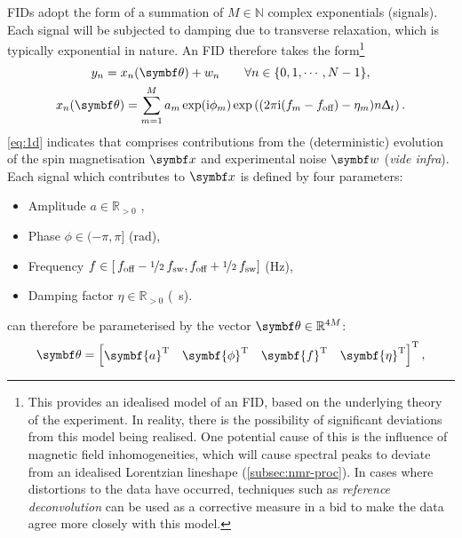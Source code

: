 \acp{FID} adopt the form of a summation of $M \in \mathbb{N}$ complex
exponentials (signals). Each signal will be subjected to damping due to
transverse relaxation, which is typically exponential in nature. An \ac{FID}
therefore takes the form\footnote{
    This provides an idealised model of an \ac{FID}, based on the
    underlying theory of the experiment. In reality, there is the possibility
    of significant deviations from this model being realised. One potential
    cause of this is the influence of magnetic field inhomogeneities, which
    will cause spectral peaks to deviate from an idealised Lorentzian lineshape
    (\cref{subsec:nmr-proc}). In cases where distortions to the data have
    occurred, techniques such as \emph{reference deconvolution}\cite{Morris1997}
    can be used as a corrective measure in a bid to make the data agree more
    closely with this model.
}
\begin{subequations}
    \begin{gather}
        y_n = x_n(\bth) + w_n \quad
            \quad \forall n \in \lbrace 0, 1, \cdots, N - 1 \rbrace,
            \label{eq:y=x+w} \\
        x_n(\bth) =
        \sumM \amexpphim \exp\left(
            (2 \pi \iu (f_m - \foff)- \eta_m ) n \Dt
        \right).
        \label{eq:x}
    \end{gather}
    \label{eq:1d}%
\end{subequations}%
\cref{eq:1d} indicates that  comprises contributions from the
(deterministic) evolution of the spin magnetisation $\bx$ and experimental
noise $\bw$ (\emph{vide infra}). Each signal which contributes to $\bx$ is
defined by four parameters:
\begin{itemize}
    \item Amplitude $a \in \mathbb{R}_{>0}$ ,
    \label{pg:param-constraints}
    \item Phase $\phi \in (-\pi, \pi]$ (\unit{\radian}),
    \item Frequency $f \in \left[\hspace*{2pt}f_{\text{off}} - \nicefrac{1}{2} \hspace*{2pt}
        f_{\mathrm{sw}}, f_{\text{off}} + \nicefrac{1}{2} \hspace*{2pt}f_{\mathrm{sw}} \right]$ (\unit{\hertz}),
    \item Damping factor $\eta \in \mathbb{R}_{>0}$ (\unit{\per\second}).
\end{itemize}%
 can therefore be parameterised by the vector $\bth \in
\mathbb{R}^{4M}$:
\begin{equation}
    \bth =
    \begin{bmatrix}
        \symbf{a}\T & \symbf{\phi}\T & \symbf{f}\T & \symbf{\eta}\T
    \end{bmatrix}\T,
\end{equation}
